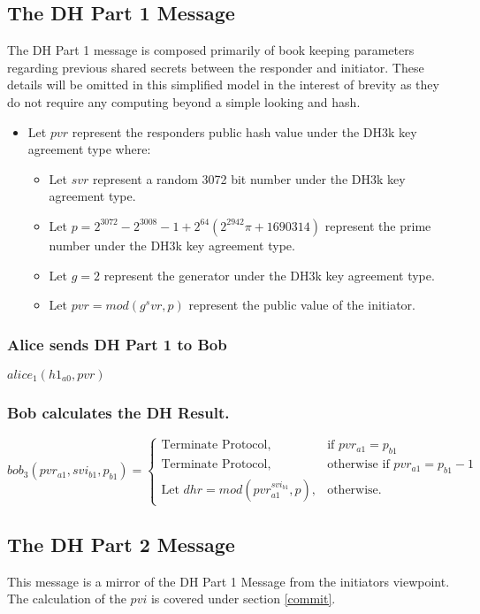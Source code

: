 \documentclass[11pt]{article}
\begin{document}
  \subsection{The DH Part 1 Message}
  The DH Part 1 message is composed primarily of book keeping parameters
  regarding previous shared secrets between the responder and initiator. These
  details will be omitted in this simplified model in the interest of brevity as
  they do not require any computing beyond a simple looking and hash.
  \begin{itemize}
    \item Let $pvr$ represent the responders public hash value under the DH3k
      key agreement type where:
      \begin{itemize}
        \item Let $svr$ represent a random 3072 bit number under the DH3k key
              agreement type.
      \item Let $p = 2^{3072} - 2^{3008} - 1 + 2^{64}(2^{2942}\pi + 1690314)$ represent
              the prime number under the DH3k key agreement type.
        \item Let $g = 2$ represent the generator under the DH3k key agreement
              type.
        \item Let $pvr = mod(g^svr, p)$ represent the public value of the
              initiator.
      \end{itemize}
  \end{itemize}
  \subsubsection{Alice sends DH Part 1 to Bob}
  $alice_1(h1_{a0},pvr)$

  \subsubsection{Bob calculates the DH Result.}
  \[
    bob_3(pvr_{a1},svi_{b1},p_{b1})=
    \begin{cases}
      \text{Terminate Protocol}, &\text{if } pvr_{a1} = p_{b1} \\
      \text{Terminate Protocol}, &\text{otherwise if } pvr_{a1} = p_{b1} - 1 \\
      \text{Let $dhr = mod(pvr_{a1}^{svi_{b1}},p)$}, &\text{otherwise.}
    \end{cases}
  \]
  \subsection{The DH Part 2 Message}
  This message is a mirror of the DH Part 1 Message from the initiators
  viewpoint. The calculation of the $pvi$ is covered under section
  \ref{commit}.
\end{document}
